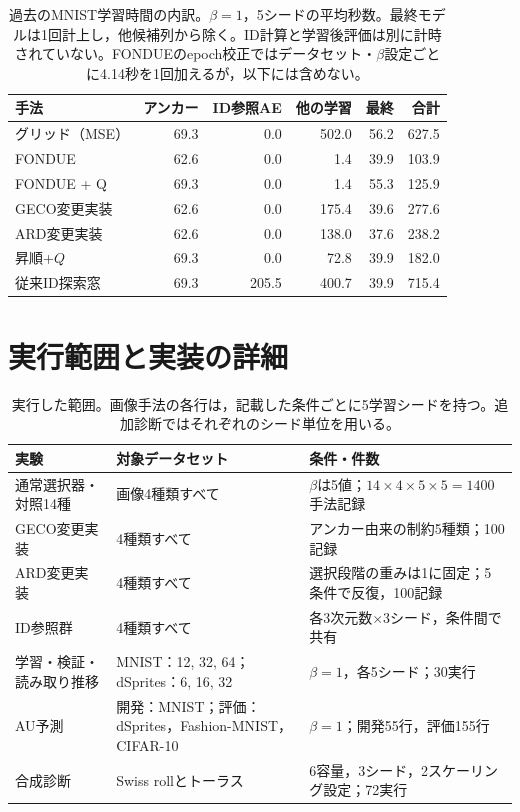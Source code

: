 \documentclass[11pt,a4paper]{ltjsarticle}
\begin{document}
\begin{table}[H]
\caption{過去のMNIST学習時間の内訳。$\beta=1$，5シードの平均秒数。最終モデルは1回計上し，他候補列から除く。ID計算と学習後評価は別に計時されていない。FONDUEのepoch校正ではデータセット・$\beta$設定ごとに4.14秒を1回加えるが，以下には含めない。}\label{tab:cost}
\footnotesize
\setlength{\tabcolsep}{3.5pt}
\begin{tabular*}{\textwidth}{@{\extracolsep{\fill}}lrrrrr@{}}
\toprule
手法 & アンカー & ID参照AE & 他の学習 & 最終 & 合計 \\
\midrule
グリッド（MSE） & 69.3 & 0.0 & 502.0 & 56.2 & 627.5 \\
FONDUE & 62.6 & 0.0 & 1.4 & 39.9 & 103.9 \\
FONDUE + Q & 69.3 & 0.0 & 1.4 & 55.3 & 125.9 \\
GECO変更実装 & 62.6 & 0.0 & 175.4 & 39.6 & 277.6 \\
ARD変更実装 & 62.6 & 0.0 & 138.0 & 37.6 & 238.2 \\
昇順+$Q$ & 69.3 & 0.0 & 72.8 & 39.9 & 182.0 \\
従来ID探索窓 & 69.3 & 205.5 & 400.7 & 39.9 & 715.4 \\
\bottomrule
\end{tabular*}
\end{table}

\section{実行範囲と実装の詳細}\label{app:coverage}
\begin{table}[H]
\caption{実行した範囲。画像手法の各行は，記載した条件ごとに5学習シードを持つ。追加診断ではそれぞれのシード単位を用いる。}
\label{tab:coverage}\small
\begin{tabularx}{\textwidth}{lXX}\toprule
実験 & 対象データセット & 条件・件数 \\\midrule
通常選択器・対照14種 & 画像4種類すべて & $\beta$は5値；$14\times4\times5\times5=1400$手法記録 \\
GECO変更実装 & 4種類すべて & アンカー由来の制約5種類；100記録 \\
ARD変更実装 & 4種類すべて & 選択段階の重みは1に固定；5条件で反復，100記録 \\
ID参照群 & 4種類すべて & 各3次元数$\times$3シード，条件間で共有 \\
学習・検証・読み取り推移 & MNIST：12, 32, 64；dSprites：6, 16, 32 & $\beta=1$，各5シード；30実行 \\
AU予測 & 開発：MNIST；評価：dSprites，Fashion-MNIST，CIFAR-10 & $\beta=1$；開発55行，評価155行 \\
合成診断 & Swiss rollとトーラス & 6容量，3シード，2スケーリング設定；72実行 \\
\bottomrule\end{tabularx}
\end{table}
\end{document}
